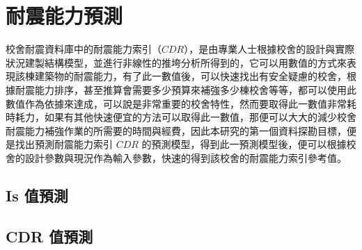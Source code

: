 \renewcommand\thetable{\arabic{chapter}-\arabic{table}}
\chapter{耐震能力預測}

校舍耐震資料庫中的耐震能力索引（$CDR$），是由專業人士根據校舍的設計與實際狀況建製結構模型，並進行非線性的推垮分析所得到的，它可以用數值的方式來表現該棟建築物的耐震能力，有了此一數值後，可以快速找出有安全疑慮的校舍，根據耐震能力排序，甚至推算會需要多少預算來補強多少棟校舍等等，都可以使用此數值作為依據來達成，可以說是非常重要的校舍特性，然而要取得此一數值非常耗時耗力，如果有其他快速便宜的方法可以取得此一數值，那便可以大大的減少校舍耐震能力補強作業的所需要的時間與經費，因此本研究的第一個資料探勘目標，便是找出預測耐震能力索引 $CDR$ 的預測模型，得到此一預測模型後，便可以根據校舍的設計參數與現況作為輸入參數，快速的得到該校舍的耐震能力索引參考值。



\section{Is 值預測}


\section{CDR 值預測}


